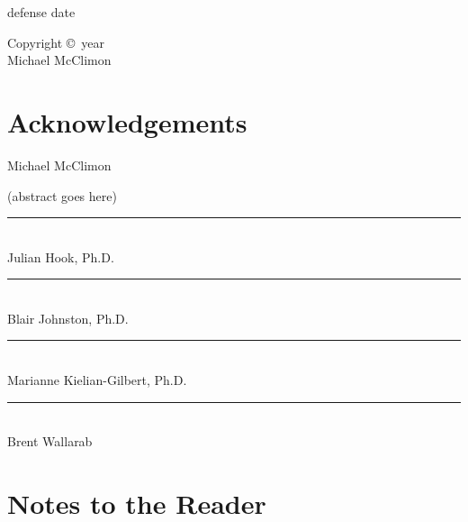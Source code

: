 \documentclass[diss]{subfiles}
\begin{document}
{\flushleft
defense date
}

\clearpage

\begin{center}
  \vspace*{\fill}
  Copyright \copyright\ year \\
  Michael McClimon
  \vspace*{\fill}
\end{center}
\clearpage


\section*{Acknowledgements}

\clearpage


\begin{center}
  Michael McClimon

  \vspace{\baselineskip}
  \MakeUppercase{\Title}
\end{center}

\doublespacing
(abstract goes here)

{\flushright

\vspace{4em}
\rule{20em}{0.5pt} \\ Julian Hook, Ph.D.

\vspace{4em}
\rule{20em}{0.5pt} \\ Blair Johnston, Ph.D.

\vspace{4em}
\rule{20em}{0.5pt} \\ Marianne Kielian-Gilbert, Ph.D.

\vspace{4em}
\rule{20em}{0.5pt} \\ Brent Wallarab

}

\singlespacing
\tableofcontents
\listoffigures
{}
\clearpage

\section*{Notes to the Reader}
\end{document}

